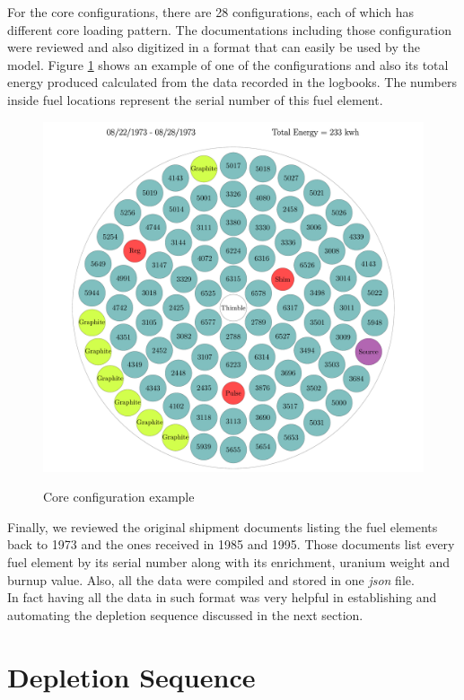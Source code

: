 \documentclass[review]{elsarticle}
\begin{document}
For the core configurations, there are 28 configurations, each of which has different core loading pattern. The documentations including those configuration were reviewed and also digitized in a format that can easily be used by the model.
Figure \ref{fig:coreii1_config} shows an example of one of the configurations and also its total energy produced calculated from the data recorded in the logbooks. The numbers inside fuel locations represent the serial number of this fuel element.

\begin{figure}[htp]
	\centering
	\includegraphics[scale=0.3]{coreii1.pdf}\\
	\caption{Core configuration example}
	\label{fig:coreii1_config}
\end{figure}

Finally, we reviewed the original shipment documents listing the fuel elements back to 1973 and the ones received in 1985 and 1995. Those documents list every fuel element by its serial number along with its enrichment, uranium weight and burnup value. Also, all the data were compiled and stored in one \emph{json} file.\\
In fact having all the data in such format was very helpful in establishing and automating the depletion sequence discussed in the next section.


\section{Depletion Sequence}
\end{document}
